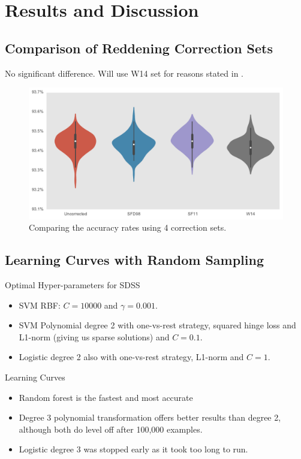 \section{Results and Discussion}
\label{sec:results1}

\subsection{Comparison of Reddening Correction Sets}
No significant difference. Will use W14 set for reasons stated in \cite{wolf14}.


\begin{figure}[tbp]
	\centering
	\includegraphics[width=\textwidth]{figures/violin_reddening_correction}
	\caption{Comparing the accuracy rates using 4 correction sets.}
	\label{fig:reddeningviolin}
\end{figure}

\subsection{Learning Curves with Random Sampling}
Optimal Hyper-parameters for SDSS
\begin{itemize}
	\item SVM RBF: $C = 10 000$ and $\gamma = 0.001$.
	\item SVM Polynomial degree 2 with one-vs-rest strategy, squared hinge loss and L1-norm
	(giving us sparse solutions) and $C = 0.1$.
	\item Logistic degree 2 also with one-vs-rest strategy, L1-norm and $C=1$.
\end{itemize}
Learning Curves
\begin{itemize}
	\item Random forest is the fastest and most accurate
	\item Degree 3 polynomial transformation offers better results than degree 2, although
	both do level off after 100,000 examples.
	\item Logistic degree 3 was stopped early as it took too long to run.
\end{itemize}


